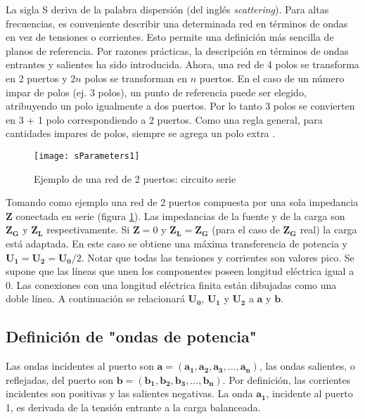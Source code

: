 La sigla S deriva de la palabra dispersión (del inglés \textit{scattering}). Para altas frecuencias, es conveniente describir una determinada red en términos de ondas en vez de tensiones o corrientes. Esto permite una definición más sencilla de planos de referencia. Por razones prácticas, la descripción en términos de ondas entrantes y salientes ha sido introducida. Ahora, una red de 4 polos se transforma en 2 puertos y $2n$ polos se transforman en $n$ puertos. En el caso de un número impar de polos (ej. 3 polos), un punto de referencia puede ser elegido, atribuyendo un polo igualmente a dos puertos. Por lo tanto 3 polos se convierten en 3 + 1 polo correspondiendo a 2 puertos. Como una regla general, para cantidades impares de polos, siempre se agrega un polo extra \cite{Caspers}.

\begin{figure}[H]
 \centering
 \texttt{[image: sParameters1]}
 \caption{Ejemplo de una red de 2 puertos: circuito serie \cite{Caspers}}
 \label{fig:esquema_serie}
\end{figure}

Tomando como ejemplo una red de 2 puertos compuesta por una sola impedancia $\bm{Z}$ conectada en serie (figura \ref{fig:esquema_serie}). Las impedancias de la fuente y de la carga son $\bm{Z_G}$ y $\bm{Z_L}$ respectivamente. Si $\bm{Z}=0$ y $\bm{Z_L} = \bm{Z_G}$ (para el caso de $\bm{Z_G}$ real) la carga está adaptada. En este caso se obtiene una máxima transferencia de potencia y $\bm{U_1} = \bm{U_2} = \bm{U_0}/2$. Notar que todas las tensiones y corrientes son valores pico. Se supone que las líneas que unen los componentes poseen longitud eléctrica igual a 0. Las conexiones con una longitud eléctrica finita están dibujadas como una doble línea. A continuación se relacionará $\bm{U_0}$, $\bm{U_1}$ y $\bm{U_2}$ a $\bm{a}$ y $\bm{b}$.


\subsection{Definición de "ondas de potencia"}

Las ondas incidentes al puerto son $\textbf{a}=(\bm{a_1}, \bm{a_2}, \bm{a_3}, ..., \bm{a_n})$, las ondas salientes, o reflejadas, del puerto son $\textbf{b}=(\bm{b_1}, \bm{b_2}, \bm{b_3}, ..., \bm{b_n})$. Por definición, las corrientes incidentes son positivas y las salientes negativas. La onda $\bm{a_1}$, incidente al puerto 1, es derivada de la tensión entrante a la carga balanceada.

